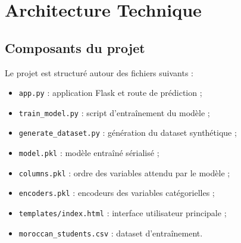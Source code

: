 \documentclass[12pt,a4paper]{report}
\begin{document}
\chapter{Architecture Technique}

\section{Composants du projet}
Le projet est structuré autour des fichiers suivants :
\begin{itemize}[label=--]
    \item \texttt{app.py} : application Flask et route de prédiction ;
    \item \texttt{train\_model.py} : script d'entraînement du modèle ;
    \item \texttt{generate\_dataset.py} : génération du dataset synthétique ;
    \item \texttt{model.pkl} : modèle entraîné sérialisé ;
    \item \texttt{columns.pkl} : ordre des variables attendu par le modèle ;
    \item \texttt{encoders.pkl} : encodeurs des variables catégorielles ;
    \item \texttt{templates/index.html} : interface utilisateur principale ;
    \item \texttt{moroccan\_students.csv} : dataset d'entraînement.
\end{itemize}
\end{document}
